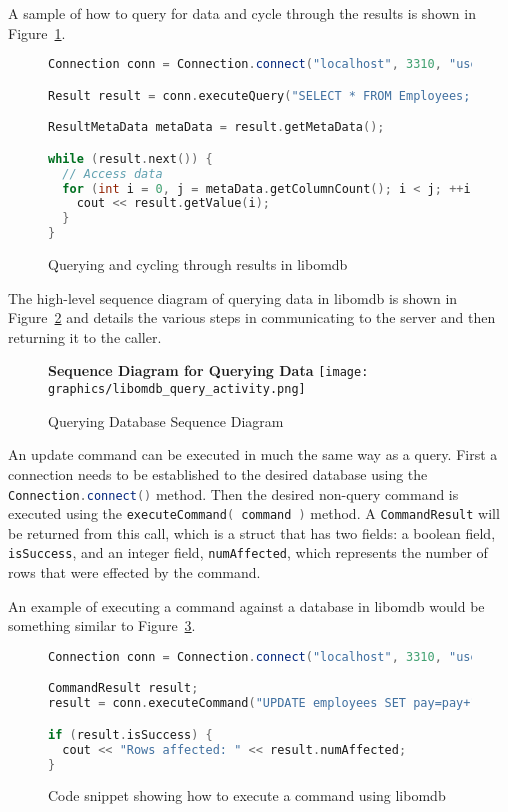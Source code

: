 \documentclass[letterpaper, 12pt]{article}
\newcommand{\inlinecode}[1]{\colorbox{codegrey}{\lstinline[language=C++]{#1}}}
\begin{document}
  A sample of how to query for data and cycle through the results is shown in Figure~\ref{code:lib_query_cycle}.
  \begin{figure}
  \begin{lstlisting}[language=C++]
Connection conn = Connection.connect("localhost", 3310, "users");

Result result = conn.executeQuery("SELECT * FROM Employees;");

ResultMetaData metaData = result.getMetaData();

while (result.next()) {
  // Access data
  for (int i = 0, j = metaData.getColumnCount(); i < j; ++i) {
    cout << result.getValue(i);
  }
}
  \end{lstlisting}
  \label{code:lib_query_cycle}
  \caption{Querying and cycling through results in libomdb}
  \end{figure}
  \par\vspace{\baselineskip}
  The high-level sequence diagram of querying data in libomdb is shown in Figure~\ref{fig:lib_query_activity}
  and details the various steps in communicating to the server and then returning it to the
  caller.

  \begin{figure}
    \centering
    \textbf{Sequence Diagram for Querying Data}
    \texttt{[image: graphics/libomdb\_query\_activity.png]}
    \caption{Querying Database Sequence Diagram}
    \label{fig:lib_query_activity}
  \end{figure}
  \par\vspace{\baselineskip}

  An update command can be executed in much the same way as a query. First
  a connection needs to be established to the desired database using the
  \inlinecode{Connection.connect()} method. Then the desired non-query
  command is executed using the \inlinecode{executeCommand( command )} method.
  A \inlinecode{CommandResult} will be returned from this call,
  which is a struct that has two fields: a boolean field,
  \inlinecode{isSuccess}, and an integer field,
  \inlinecode{numAffected}, which represents the number of rows
  that were effected by the command.
  \par\vspace{\baselineskip}
  An example of executing a command against a database in libomdb would be something similar
  to Figure~\ref{code:lib_cmd_exec}.
  \begin{figure}
  \begin{lstlisting}[language=C++]
Connection conn = Connection.connect("localhost", 3310, "users");

CommandResult result;
result = conn.executeCommand("UPDATE employees SET pay=pay+1;");

if (result.isSuccess) {
  cout << "Rows affected: " << result.numAffected;
}
  \end{lstlisting}
  \label{code:lib_cmd_exec}
  \caption{Code snippet showing how to execute a command using libomdb}
  \end{figure}
\end{document}
